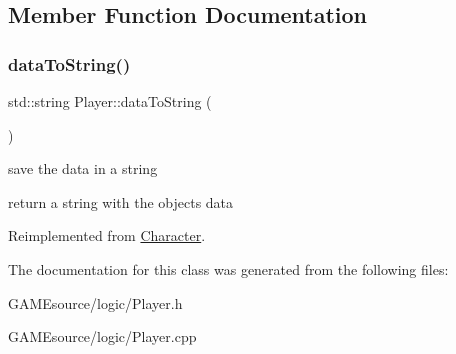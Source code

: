 \subsection{Member Function Documentation}
\mbox{\label{class_player_a3bd5a8ec31a4c46b09c4d9642e8d65ee}} 
\subsubsection{\texorpdfstring{data\+To\+String()}{dataToString()}}
{\footnotesize\ttfamily std\+::string Player\+::data\+To\+String (\begin{DoxyParamCaption}{ }\end{DoxyParamCaption})\hspace{0.3cm}{\ttfamily [virtual]}}



save the data in a string 

return a string with the object\textquotesingle{}s data 

Reimplemented from \mbox{\hyperlink{class_character_ad0d14b85124c5d0da611b2b925968277}{Character}}.



The documentation for this class was generated from the following files\+:\begin{DoxyCompactItemize}
\item 
G\+A\+M\+Esource/logic/Player.\+h\item 
G\+A\+M\+Esource/logic/Player.\+cpp\end{DoxyCompactItemize}
